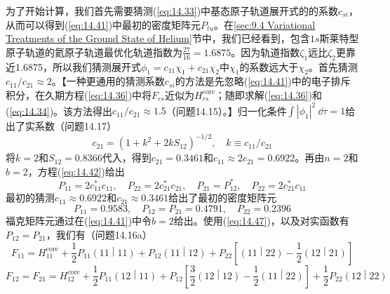 \begin{examplebox}
        为了开始计算，我们首先需要猜测(\ref{eq:14.33})中基态原子轨道展开式的的系数$c_{si}$，从而可以得到(\ref{eq:14.41})中最初的密度矩阵元$P_{tu}$。在\ref{sec:9.4 Variational Treatments of the Ground State of Helium}节中，我们已经看到，包含$1s$斯莱特型原子轨道的氦原子轨道最优化轨道指数为$\frac{27}{16} = 1.6875$。因为轨道指数$\zeta_1$远比$\zeta_2$更靠近1.6875，所以我们猜测展开式$\phi_1 = c_{11} \chi_1 + c_{21} \chi_2$中$\chi_1$的系数远大于$\chi_2$。首先猜测$c_{11} / c_{21} \approx 2$。【一种更通用的猜测系数$c_{si}$的方法是先忽略(\ref{eq:14.41})中的电子排斥积分，在久期方程(\ref{eq:14.36})中将$F_{rs}$近似为$H^{\text{core}}_{rs}$；随即求解(\ref{eq:14.36})和(\ref{eq:14.34})。该方法得出$c_{11} / c_{21} \approx 1.5$（问题14.15）。】归一化条件$\int \left|\phi_1\right|^2 \:\dd \tau = 1$给出了实系数（问题14.17）
        \begin{equation}
            c_{21} = \left(1 + k^2 + 2kS_{12}\right)^{-1/2}, \quad k \equiv c_{11} / c_{21}
            \label{eq:14.48}
        \end{equation}
        将$k=2$和$S_{12} = 0.8366$代入，得到$c_{21} = 0.3461$和$c_{11} \approx 2c_{21} = 0.6922$。再由$n=2$和$b=2$，方程(\ref{eq:14.42})给出
        \begin{equation}
            P_{11} = 2c_{11}^* c_{11}, \quad P_{22} = 2c_{21}^* c_{21}, \quad P_{21} =  P_{12}^*, \quad P_{22} = 2c_{21}^* c_{11}
            \label{eq:14.49}
        \end{equation}
        最初的猜测$c_{11} \approx 0.6922$和$c_{21} \approx 0.3461$给出了最初的密度矩阵元
        \begin{equation*}
            P_{11} = 0.9583, \quad P_{12} = P_{21} = 0.4791, \quad P_{22} = 0.2396
        \end{equation*}
        福克矩阵元通过在(\ref{eq:14.41})中令$b=2$给出。使用(\ref{eq:14.47})，以及对实函数有$P_{12} = P_{21}$，我们有（问题14.16a）
        \begin{equation*}
            F_{11} = H^{\text{core}}_{11} + \frac{1}{2} P_{11} \left(11 \middle| 11\right) + P_{12} \left(11 \middle| 12\right) + P_{22} \left[\left(11 \middle| 22\right) - \frac{1}{2}\left(12 \middle| 21\right)\right]
        \end{equation*}
        \begin{equation*}
            F_{12} = F_{21} = H^{\text{core}}_{12} + \frac{1}{2} P_{11} \left(12 \middle| 11\right) + P_{12} \left[\frac{3}{2}\left(12 \middle| 12\right) - \frac{1}{2}\left(11 \middle| 22\right)\right] + \frac{1}{2}P_{22} \left(12 \middle| 22\right)
        \end{equation*}

\end{examplebox}
